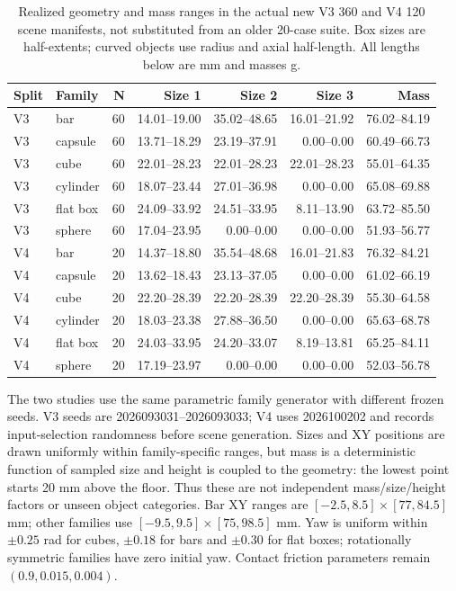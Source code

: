 \begin{table}[h]\centering\small
\caption{Realized geometry and mass ranges in the actual new V3 360 and V4 120 scene manifests, not substituted from an older 20-case suite. Box sizes are half-extents; curved objects use radius and axial half-length. All lengths below are mm and masses g.}
\begin{tabular}{llrrrrr}\toprule Split & Family & N & Size 1 & Size 2 & Size 3 & Mass\\\midrule
V3 & bar & 60 & 14.01--19.00 & 35.02--48.65 & 16.01--21.92 & 76.02--84.19 \\
V3 & capsule & 60 & 13.71--18.29 & 23.19--37.91 & 0.00--0.00 & 60.49--66.73 \\
V3 & cube & 60 & 22.01--28.23 & 22.01--28.23 & 22.01--28.23 & 55.01--64.35 \\
V3 & cylinder & 60 & 18.07--23.44 & 27.01--36.98 & 0.00--0.00 & 65.08--69.88 \\
V3 & flat box & 60 & 24.09--33.92 & 24.51--33.95 & 8.11--13.90 & 63.72--85.50 \\
V3 & sphere & 60 & 17.04--23.95 & 0.00--0.00 & 0.00--0.00 & 51.93--56.77 \\
V4 & bar & 20 & 14.37--18.80 & 35.54--48.68 & 16.01--21.83 & 76.32--84.21 \\
V4 & capsule & 20 & 13.62--18.43 & 23.13--37.05 & 0.00--0.00 & 61.02--66.19 \\
V4 & cube & 20 & 22.20--28.39 & 22.20--28.39 & 22.20--28.39 & 55.30--64.58 \\
V4 & cylinder & 20 & 18.03--23.38 & 27.88--36.50 & 0.00--0.00 & 65.63--68.78 \\
V4 & flat box & 20 & 24.03--33.95 & 24.20--33.07 & 8.19--13.81 & 65.25--84.11 \\
V4 & sphere & 20 & 17.19--23.97 & 0.00--0.00 & 0.00--0.00 & 52.03--56.78 \\
\bottomrule\end{tabular}\end{table}
The two studies use the same parametric family generator with different frozen seeds. V3 seeds are 2026093031--2026093033; V4 uses 2026100202 and records input-selection randomness before scene generation. Sizes and XY positions are drawn uniformly within family-specific ranges, but mass is a deterministic function of sampled size and height is coupled to the geometry: the lowest point starts 20 mm above the floor. Thus these are not independent mass/size/height factors or unseen object categories. Bar XY ranges are $[-2.5,8.5]\times[77,84.5]$ mm; other families use $[-9.5,9.5]\times[75,98.5]$ mm. Yaw is uniform within $\pm0.25$ rad for cubes, $\pm0.18$ for bars and $\pm0.30$ for flat boxes; rotationally symmetric families have zero initial yaw. Contact friction parameters remain $(0.9,0.015,0.004)$.
